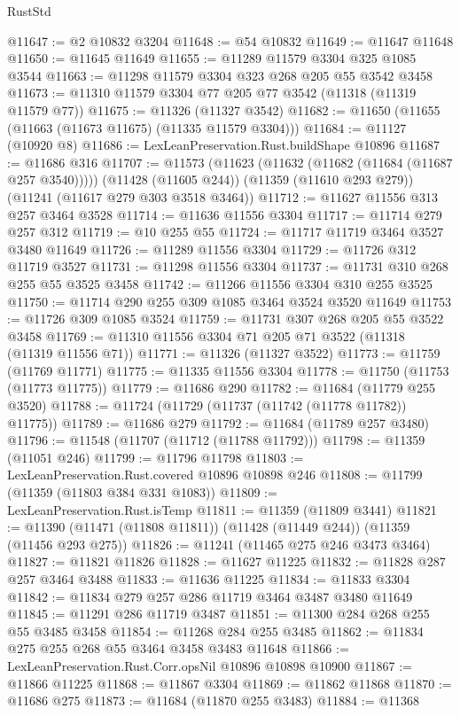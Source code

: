 \begin{lexlean}{RustStd}
\begin{coremodule}
{{{{{{{{{{{{{{{{{{{@11647 := @2 @10832 @3204
@11648 := @54 @10832
@11649 := @11647 @11648
@11650 := @11645 @11649
@11655 := @11289 @11579 @3304 @325 @1085 @3544
@11663 := @11298 @11579 @3304 @323 @268 @205 @55 @3542 @3458
@11673 := @11310 @11579 @3304 @77 @205 @77 @3542 (@11318 (@11319 @11579 @77))
@11675 := @11326 (@11327 @3542)
@11682 := @11650 (@11655 (@11663 (@11673 @11675) (@11335 @11579 @3304)))
@11684 := @11127 (@10920 @8)
@11686 := LexLeanPreservation.Rust.buildShape @10896
@11687 := @11686 @316
@11707 := @11573
    (@11623 (@11632 (@11682 (@11684 (@11687 @257 @3540)))))
    (@11428 (@11605 @244))
    (@11359 (@11610 @293 @279))
    (@11241 (@11617 @279 @303 @3518 @3464))
@11712 := @11627 @11556 @313 @257 @3464 @3528
@11714 := @11636 @11556 @3304
@11717 := @11714 @279 @257 @312
@11719 := @10 @255 @55
@11724 := @11717 @11719 @3464 @3527 @3480 @11649
@11726 := @11289 @11556 @3304
@11729 := @11726 @312 @11719 @3527
@11731 := @11298 @11556 @3304
@11737 := @11731 @310 @268 @255 @55 @3525 @3458
@11742 := @11266 @11556 @3304 @310 @255 @3525
@11750 := @11714 @290 @255 @309 @1085 @3464 @3524 @3520 @11649
@11753 := @11726 @309 @1085 @3524
@11759 := @11731 @307 @268 @205 @55 @3522 @3458
@11769 := @11310 @11556 @3304 @71 @205 @71 @3522 (@11318 (@11319 @11556 @71))
@11771 := @11326 (@11327 @3522)
@11773 := @11759 (@11769 @11771)
@11775 := @11335 @11556 @3304
@11778 := @11750 (@11753 (@11773 @11775))
@11779 := @11686 @290
@11782 := @11684 (@11779 @255 @3520)
@11788 := @11724 (@11729 (@11737 (@11742 (@11778 @11782)) @11775))
@11789 := @11686 @279
@11792 := @11684 (@11789 @257 @3480)
@11796 := @11548 (@11707 (@11712 (@11788 @11792)))
@11798 := @11359 (@11051 @246)
@11799 := @11796 @11798
@11803 := LexLeanPreservation.Rust.covered @10896 @10898 @246
@11808 := @11799 (@11359 (@11803 @384 @331 @1083))
@11809 := LexLeanPreservation.Rust.isTemp
@11811 := @11359 (@11809 @3441)
@11821 := @11390 (@11471 (@11808 @11811)) (@11428 (@11449 @244)) (@11359 (@11456 @293 @275))
@11826 := @11241 (@11465 @275 @246 @3473 @3464)
@11827 := @11821 @11826
@11828 := @11627 @11225
@11832 := @11828 @287 @257 @3464 @3488
@11833 := @11636 @11225
@11834 := @11833 @3304
@11842 := @11834 @279 @257 @286 @11719 @3464 @3487 @3480 @11649
@11845 := @11291 @286 @11719 @3487
@11851 := @11300 @284 @268 @255 @55 @3485 @3458
@11854 := @11268 @284 @255 @3485
@11862 := @11834 @275 @255 @268 @55 @3464 @3458 @3483 @11648
@11866 := LexLeanPreservation.Rust.Corr.opsNil @10896 @10898 @10900
@11867 := @11866 @11225
@11868 := @11867 @3304
@11869 := @11862 @11868
@11870 := @11686 @275
@11873 := @11684 (@11870 @255 @3483)
@11884 := @11368
}}}}}}}}}}}}}}}}}}}
\end{coremodule}
\end{lexlean}
